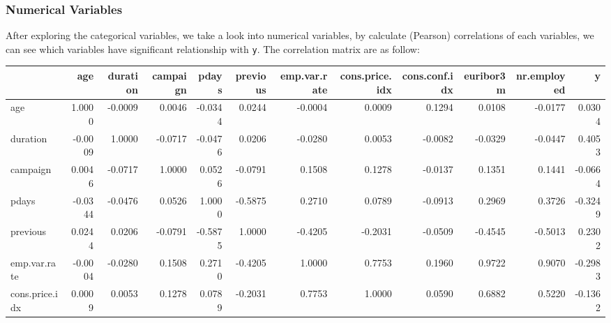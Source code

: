 \documentclass[11pt,a4paper]{article}
\begin{document}
    \subsubsection{Numerical Variables}
    After exploring the categorical variables, we take a look into numerical variables, by calculate (Pearson) correlations of each variables, we can see which variables have significant relationship with \texttt{y}. The correlation matrix are as follow: 
    \begin{table}[h]
        \centering
        {\tiny
            \begin{tabular}{l||rrrrrrrrrrr}
                {} &     age &  duration &  campaign &   pdays &  previous &  emp.var.rate &  cons.price.idx &  cons.conf.idx &  euribor3m &  nr.employed &       y \\
                \hline \hline
                age            &  1.0000 &   -0.0009 &    0.0046 & -0.0344 &    0.0244 &       -0.0004 &          0.0009 &         0.1294 &     0.0108 &      -0.0177 &  0.0304 \\
                duration       & -0.0009 &    1.0000 &   -0.0717 & -0.0476 &    0.0206 &       -0.0280 &          0.0053 &        -0.0082 &    -0.0329 &      -0.0447 &  0.4053 \\
                campaign       &  0.0046 &   -0.0717 &    1.0000 &  0.0526 &   -0.0791 &        0.1508 &          0.1278 &        -0.0137 &     0.1351 &       0.1441 & -0.0664 \\
                pdays          & -0.0344 &   -0.0476 &    0.0526 &  1.0000 &   -0.5875 &        0.2710 &          0.0789 &        -0.0913 &     0.2969 &       0.3726 & -0.3249 \\
                previous       &  0.0244 &    0.0206 &   -0.0791 & -0.5875 &    1.0000 &       -0.4205 &         -0.2031 &        -0.0509 &    -0.4545 &      -0.5013 &  0.2302 \\
                emp.var.rate   & -0.0004 &   -0.0280 &    0.1508 &  0.2710 &   -0.4205 &        1.0000 &          0.7753 &         0.1960 &     0.9722 &       0.9070 & -0.2983 \\
                cons.price.idx &  0.0009 &    0.0053 &    0.1278 &  0.0789 &   -0.2031 &        0.7753 &         1.0000 &         0.0590 &     0.6882 &       0.5220 & -0.1362 \\

\end{tabular}}
\end{table}
\end{document}
